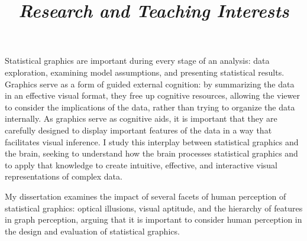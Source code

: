 \documentclass[12pt, letterpaper, sans]{moderncv}
\title{\emph{Research and Teaching Interests}}
\begin{document}
\makecvtitle
\setlength{\parindent}{15pt} %


Statistical graphics are important during every stage of an analysis: data exploration, examining model assumptions, and presenting statistical results. Graphics serve as a form of guided external cognition: by summarizing the data in an effective visual format, they free up cognitive resources, allowing the viewer to consider the implications of the data, rather than trying to organize the data internally. As graphics serve as cognitive aids, it is important that they are carefully designed to display important features of the data in a way that facilitates visual inference. I study this interplay between statistical graphics and the brain, seeking to understand how the brain processes statistical graphics and to apply that knowledge to create intuitive, effective, and interactive visual representations of complex data.




\vspace{.5cm}\hspace{8pt} My dissertation examines the impact of several facets of human perception of statistical graphics: optical illusions, visual aptitude, and the hierarchy of features in graph perception, arguing that it is important to consider human perception in the design and evaluation of statistical graphics.
\end{document}
